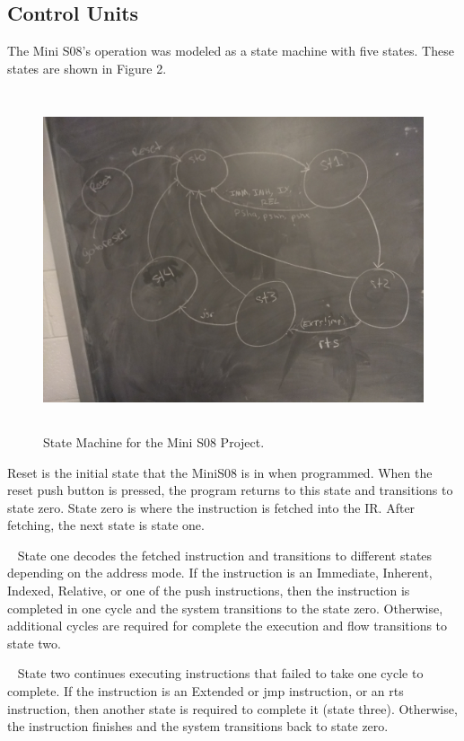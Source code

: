 \documentclass[letterpaper, 12pt]{article}
\begin{document}
\begin{flushleft}
\section*{Control Units}
The Mini S08's operation was modeled as a state machine with five states.  These states are shown in Figure 2.
 \begin{figure}[H]
 	\centering
	\includegraphics[width=\linewidth,height=10cm,keepaspectratio]{s08_states.jpg}
	\caption[Mini S08 State Machine Diagram]{State Machine for the Mini S08 Project.}
	\label{fig:arch}
\end{figure}

Reset is the initial state that the MiniS08 is in when programmed.  When the reset push button is pressed, the program returns to this state and transitions to state zero. State zero is where the instruction is fetched into the IR.  After fetching, the next state is state one.

~\newline
State one decodes the fetched instruction and transitions to different states depending on the address mode.  If the instruction is an Immediate, Inherent, Indexed, Relative, or one of the push instructions, then the instruction is completed in one cycle and the system transitions to the state zero.  Otherwise, additional cycles are required for complete the execution and flow transitions to state two.

~\newline
State two continues executing instructions that failed to take one cycle to complete.  If the instruction is an Extended or jmp instruction, or an rts instruction, then another state is required to complete it (state three).  Otherwise, the instruction finishes and the system transitions back to state zero.


\end{flushleft}
\end{document}
